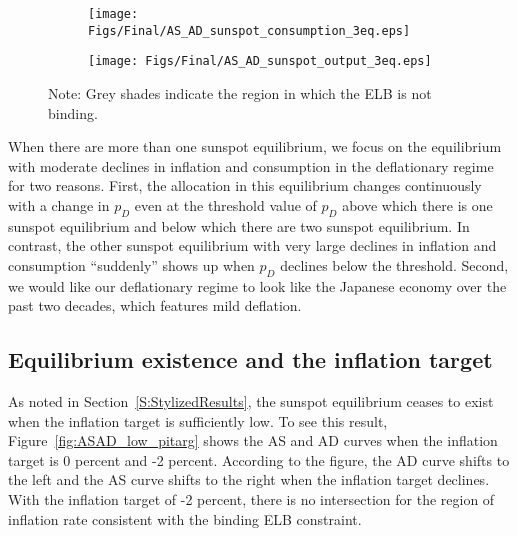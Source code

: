 \documentclass[11pt]{article}
\begin{document}
\begin{singlespace}
		\begin{figure}[h]
			\caption{AD and AS Curves in the Deflationary Regime\\---Low $p_D$---} \label{fig:ASAD_low_pD}
            \vspace{-1em}
			\begin{center}
				\begin{subfigure}[b]{0.4\textwidth}
					\centering
					\texttt{[image: Figs/Final/AS\_AD\_sunspot\_consumption\_3eq.eps]}
				\end{subfigure}
				\hspace{0.5cm}  
				\begin{subfigure}[b]{0.4\textwidth}
					\centering
					\texttt{[image: Figs/Final/AS\_AD\_sunspot\_output\_3eq.eps]}
				\end{subfigure}
			\end{center}
	        \vspace{-1em}
			{\footnotesize Note: Grey shades indicate the region in which the ELB is not binding.}
		\end{figure}

		When there are more than one sunspot equilibrium, we focus on the equilibrium with moderate declines in inflation and consumption in the deflationary regime for two reasons. First, the allocation in this equilibrium changes continuously with a change in $p_{D}$ even at the threshold value of $p_{D}$ above which there is one sunspot equilibrium and below which there are two sunspot equilibrium. In contrast, the other sunspot equilibrium with very large declines in inflation and consumption ``suddenly'' shows up when $p_{D}$ declines below the threshold. Second, we would like our deflationary regime to look like the Japanese economy over the past two decades, which features mild deflation.
		
		\subsection{Equilibrium existence and the inflation target}
		
		As noted in Section~\ref{S:StylizedResults}, the sunspot equilibrium ceases to exist when the inflation target is sufficiently low. To see this result, Figure~\ref{fig:ASAD_low_pitarg} shows the AS and AD curves when the inflation target is 0 percent and -2 percent. According to the figure, the AD curve shifts to the left and the AS curve shifts to the right when the inflation target declines. With the inflation target of -2 percent, there is no intersection for the region of inflation rate consistent with the binding ELB constraint.
		

\end{singlespace}
\end{document}
